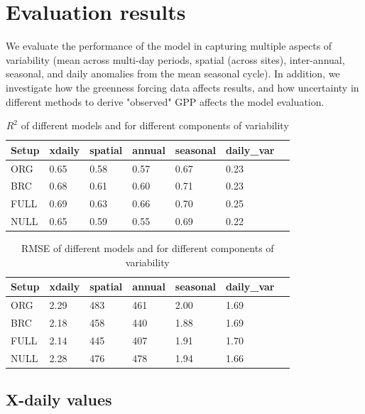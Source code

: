 \documentclass{myreport}
\begin{document}
\section{Evaluation results}

We evaluate the performance of the model in capturing multiple aspects of variability (mean across multi-day periods, spatial (across sites), inter-annual, seasonal, and daily anomalies from the mean seasonal cycle). In addition, we investigate how the greenness forcing data affects results, and how uncertainty in different methods to derive "observed" GPP affects the model evaluation.

\begin{table}
\centering
\begin{tabular}{lllllll}
  \toprule
  Setup & xdaily & spatial & annual & seasonal & daily\_var \\ 
  \midrule
  ORG & 0.65 & 0.58 & 0.57 & 0.67 & 0.23 \\ 
  BRC & 0.68 & 0.61 & 0.60 & 0.71 & 0.23 \\ 
  FULL & 0.69 & 0.63 & 0.66 & 0.70 & 0.25 \\ 
  NULL & 0.65 & 0.59 & 0.55 & 0.69 & 0.22 \\ 
  \bottomrule
  \end{tabular}
\caption{$R^2$ of different models and for different components of variability} 
\label{tab:rsq}
\end{table}

\begin{table}
\centering
\begin{tabular}{lllllll}
  \toprule
  Setup & xdaily & spatial & annual & seasonal & daily\_var \\ 
  \midrule
  ORG & 2.29 & 483 & 461 & 2.00 & 1.69 \\ 
  BRC & 2.18 & 458 & 440 & 1.88 & 1.69 \\ 
  FULL & 2.14 & 445 & 407 & 1.91 & 1.70 \\ 
  NULL & 2.28 & 476 & 478 & 1.94 & 1.66 \\ 
  \bottomrule
  \end{tabular}
\caption{RMSE of different models and for different components of variability} 
\label{tab:rmse}
\end{table}

\clearpage

\subsection{X-daily values}
\end{document}
